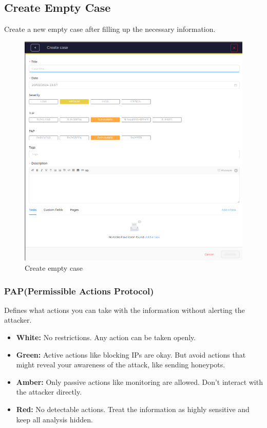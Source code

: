 \documentclass{book}
\begin{document}
\newpage

\subsection{Create Empty Case}
Create a new empty case after filling up the necessary information. 
\begin{figure}[h]
    \centering
    \includegraphics[width=0.9\linewidth]{Case_images/emptycase.png}
    \caption{Create empty case}
    \label{fig:emptycaseoverlay}
\end{figure}

\subsubsection{PAP(Permissible Actions Protocol)}
Defines what actions you can take with the information without alerting the attacker.
\begin{itemize}
    \item \textbf{White:} No restrictions. Any action can be taken openly.
    \item \textbf{Green:} Active actions like blocking IPs are okay. But avoid actions that might reveal your awareness of the attack, like sending honeypots.
    \item \textbf{Amber:}  Only passive actions like monitoring are allowed. Don't interact with the attacker directly.
    \item \textbf{Red:} No detectable actions. Treat the information as highly sensitive and keep all analysis hidden.
\end{itemize}
\end{document}
